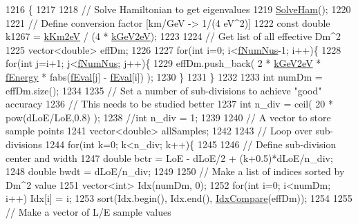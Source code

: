 \begin{DoxyCode}
1216 \{
1217 
1218   \textcolor{comment}{// Solve Hamiltonian to get eigenvalues}
1219   \hyperlink{classOscProb_1_1PMNS__Base_a91f065cb9e910e0095e41462b4420b01}{SolveHam}();
1220 
1221   \textcolor{comment}{// Define conversion factor [km/GeV -> 1/(4 eV^2)]}
1222   \textcolor{keyword}{const} \textcolor{keywordtype}{double} k1267 = \hyperlink{classOscProb_1_1PMNS__Base_a382ddd7b76ca89b43f22614a2ea7327b}{kKm2eV} / (4 * \hyperlink{classOscProb_1_1PMNS__Base_ad36a0a6bf58d6ec093d3947784bd89e9}{kGeV2eV});
1223 
1224   \textcolor{comment}{// Get list of all effective Dm^2}
1225   vector<double> effDm;
1226 
1227   \textcolor{keywordflow}{for}(\textcolor{keywordtype}{int} i=0; i<\hyperlink{classOscProb_1_1PMNS__Base_a24bb74bed63569dfe88b18fa6a08060e}{fNumNus}-1; i++)\{
1228     \textcolor{keywordflow}{for}(\textcolor{keywordtype}{int} j=i+1; j<\hyperlink{classOscProb_1_1PMNS__Base_a24bb74bed63569dfe88b18fa6a08060e}{fNumNus}; j++)\{
1229       effDm.push\_back( 2 * \hyperlink{classOscProb_1_1PMNS__Base_ad36a0a6bf58d6ec093d3947784bd89e9}{kGeV2eV} * \hyperlink{classOscProb_1_1PMNS__Base_a2800af6d436972f3e900867790c046b0}{fEnergy} * fabs(\hyperlink{classOscProb_1_1PMNS__Base_a6319c34d7decbb9d7d6da279c06e8c2d}{fEval}[j] - 
      \hyperlink{classOscProb_1_1PMNS__Base_a6319c34d7decbb9d7d6da279c06e8c2d}{fEval}[i]) );
1230     \}
1231   \}
1232 
1233   \textcolor{keywordtype}{int} numDm = effDm.size();
1234 
1235   \textcolor{comment}{// Set a number of sub-divisions to achieve "good" accuracy}
1236   \textcolor{comment}{// This needs to be studied better}
1237   \textcolor{keywordtype}{int} n\_div = ceil( 20 * pow(dLoE/LoE,0.8) );
1238   \textcolor{comment}{//int n\_div = 1;}
1239 
1240   \textcolor{comment}{// A vector to store sample points}
1241   vector<double> allSamples;
1242 
1243   \textcolor{comment}{// Loop over sub-divisions}
1244   \textcolor{keywordflow}{for}(\textcolor{keywordtype}{int} k=0; k<n\_div; k++)\{
1245 
1246     \textcolor{comment}{// Define sub-division center and width}
1247     \textcolor{keywordtype}{double} bctr = LoE - dLoE/2 + (k+0.5)*dLoE/n\_div;
1248     \textcolor{keywordtype}{double} bwdt = dLoE/n\_div;
1249 
1250     \textcolor{comment}{// Make a list of indices sorted by Dm^2 value}
1251     vector<int> Idx(numDm, 0);
1252     \textcolor{keywordflow}{for}(\textcolor{keywordtype}{int} i=0; i<numDm; i++) Idx[i] = i;
1253     sort(Idx.begin(), Idx.end(), \hyperlink{structOscProb_1_1IdxCompare}{IdxCompare}(effDm));
1254 
1255     \textcolor{comment}{// Make a vector of L/E sample values}

\end{DoxyCode}
